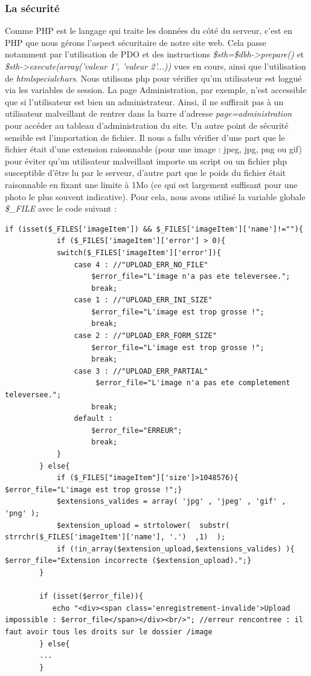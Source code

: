 \documentclass[titlepage,11pt,a4paper]{article}
\begin{document}
\subsubsection{La sécurité}

Comme PHP est le langage qui traite les données du côté du serveur, c'est en PHP que nous gérons l'aspect sécuritaire de notre site web. Cela passe notamment par l'utilisation de PDO et des instructions \emph{\$sth=\$dbh->prepare()} et \emph{\$sth->execute(array('valeur 1', 'valeur 2'...))} vues en cours, ainsi que l'utilisation de \emph{htmlspecialchars}. Nous utilisons php pour vérifier qu'un utilisateur est loggué via les variables de session. La page Administration, par exemple, n'est accessible que si l'utilisateur est bien un administrateur. Ainsi, il ne suffirait pas à un utilisateur malveillant de rentrer dans la barre d'adresse \emph{page=administration} pour accéder au tableau d'administration du site. Un autre point de sécurité sensible est l'importation de fichier. Il nous a fallu vérifier d'une part que le fichier était d'une extension raisonnable (pour une image : jpeg, jpg, png ou gif) pour éviter qu'un utilisateur malveillant importe un script ou un fichier php susceptible d'être lu par le serveur, d'autre part que le poids du fichier était raisonnable en fixant une limite à 1Mo (ce qui est largement suffisant pour une photo le plus souvent indicative). Pour cela, nous avons utilisé la variable globale \emph{\$\_FILE} avec le code suivant :

\begin{lstlisting}[title=Securite upload image]
if (isset($_FILES['imageItem']) && $_FILES['imageItem']['name']!=""){
            if ($_FILES['imageItem']['error'] > 0){
            switch($_FILES['imageItem']['error']){
                case 4 : //"UPLOAD_ERR_NO_FILE"
                    $error_file="L'image n'a pas ete televersee.";
                    break;
                case 1 : //"UPLOAD_ERR_INI_SIZE"
                    $error_file="L'image est trop grosse !";
                    break;
                case 2 : //"UPLOAD_ERR_FORM_SIZE"
                    $error_file="L'image est trop grosse !";
                    break;
                case 3 : //"UPLOAD_ERR_PARTIAL"
                     $error_file="L'image n'a pas ete completement televersee.";
                    break;
                default :
                    $error_file="ERREUR";
                    break;
            }
        } else{
            if ($_FILES["imageItem"]['size']>1048576){ $error_file="L'image est trop grosse !";}
            $extensions_valides = array( 'jpg' , 'jpeg' , 'gif' , 'png' );
            $extension_upload = strtolower(  substr(  strrchr($_FILES['imageItem']['name'], '.')  ,1)  );
            if (!in_array($extension_upload,$extensions_valides) ){ $error_file="Extension incorrecte ($extension_upload).";}
        }
        
        if (isset($error_file)){
           echo "<div><span class='enregistrement-invalide'>Upload impossible : $error_file</span></div><br/>"; //erreur rencontree : il faut avoir tous les droits sur le dossier /image
        } else{
        ...
        }
\end{lstlisting}
\end{document}
